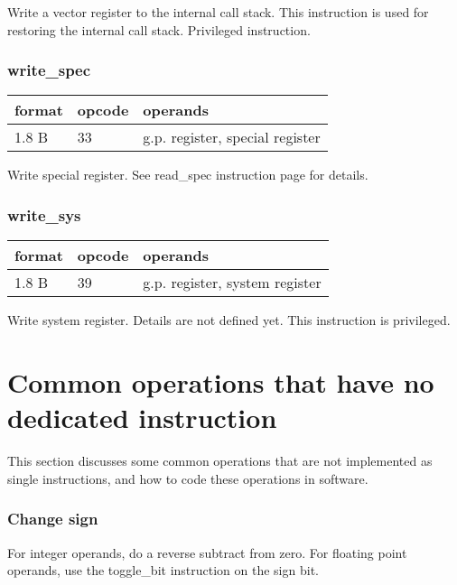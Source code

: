 \documentclass[forwardcom.tex]{subfiles}
\begin{document}
Write a vector register to the internal call stack. This instruction is used for restoring the internal call stack.
Privileged instruction.
\vspace{2mm}

\subsubsection{write\_spec}
\label{table:writeSpecInstruction}
\begin{tabular}{|p{12mm}|p{12mm}|p{110mm}|}
\hline
\bfseries format & \bfseries opcode & \bfseries operands \\ \hline
1.8 B & 33 & g.p. register, special register \\ \hline
\end{tabular}
\vspace{2mm}

Write special register. See read\_spec instruction page \pageref{table:readSpecInstruction} for details.

\subsubsection{write\_sys}
\label{table:writeSysInstruction}
\begin{tabular}{|p{12mm}|p{12mm}|p{110mm}|}
\hline
\bfseries format & \bfseries opcode & \bfseries operands \\ \hline
1.8 B & 39 & g.p. register, system register \\ \hline
\end{tabular}
\vspace{2mm}

Write system register. Details are not defined yet. This instruction is privileged.
\vspace{2mm}


\section{Common operations that have no dedicated instruction}
This section discusses some common operations that are not implemented as single instructions, and how to code these operations in software.

\subsubsection{Change sign}
For integer operands, do a reverse subtract from zero. For floating point operands, use the toggle\_bit instruction on the sign bit.
\end{document}
